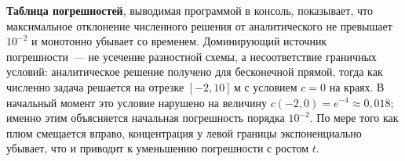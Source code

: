         \textbf{Таблица погрешностей}, выводимая программой в консоль,
        показывает, что максимальное отклонение численного решения от
        аналитического не превышает $10^{-2}$ и монотонно убывает со временем.
        Доминирующий источник погрешности~--- не усечение разностной схемы,
        а несоответствие граничных условий: аналитическое решение получено для
        бесконечной прямой, тогда как численно задача решается на отрезке $[-2, 10]$\,м
        с условием $c = 0$ на краях.
        В начальный момент это условие нарушено на величину
        $c(-2, 0) = e^{-4} \approx 0{,}018$; именно этим объясняется
        начальная погрешность порядка $10^{-2}$.
        По мере того как плюм смещается вправо, концентрация у левой границы
        экспоненциально убывает, что и приводит к уменьшению погрешности
        с ростом $t$.
